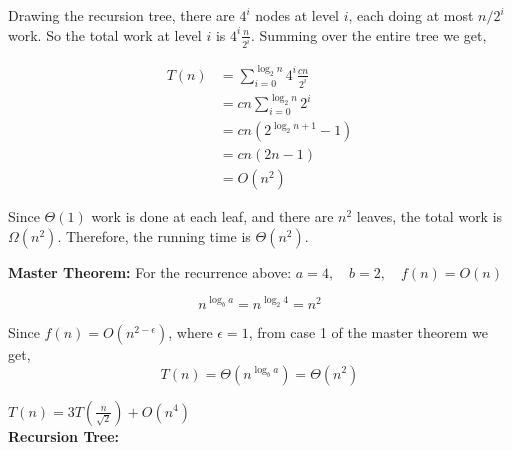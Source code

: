 \documentclass[12pt,twoside]{article}
\begin{document}
\begin{problems}
\begin{problemparts}
Drawing the recursion tree, there are $4^i$ nodes at level $i$, each doing at most $n/2^i$ work. So the total work at level $i$ is $4^i \frac{n}{2^i}$. Summing over the entire tree we get, 

\[
	\begin{split}
		T(n) &= \sum_{i=0}^{\log_2 n} 4^i \frac{cn}{2^i} \\
		&= cn \sum_{i=0}^{\log_2 n} 2^i \\
		&= cn (2^{\log_2 n +1} - 1) \\
		&= cn (2n - 1) \\
		&= O(n^2)
	\end{split}
\]

Since $\Theta(1)$ work is done at each leaf, and there are $n^2$ leaves, the total work is $\Omega(n^2)$. Therefore, the running time is $\Theta(n^2)$.


\textbf{Master Theorem:} For the recurrence above: \(a=4, \quad b=2, \quad f(n) = O(n)\)  

\[n^{\log_b a} = n^{\log_2 4} = n^{2}\]

Since \( f(n) = O(n^{2-\epsilon})\), where \( \epsilon = 1\), from case 1 of the master theorem we get,
\[ T(n) = \Theta(n^{\log_b a}) = \Theta(n^2)  \]



\problempart %
\( T(n) = 3T\left (\frac{n}{\sqrt{2}}\right ) + O(n^4)\) \\

\textbf{Recursion Tree:}


\end{problemparts}
\end{problems}
\end{document}
